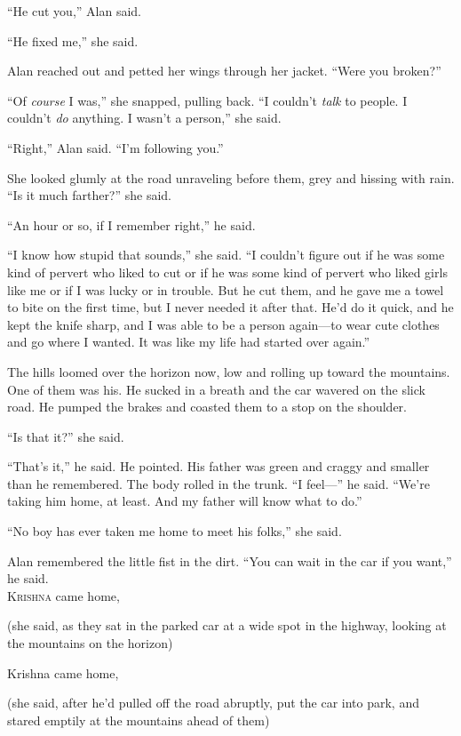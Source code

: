 ``He cut you,'' Alan said.

``He fixed me,'' she said.

Alan reached out and petted her wings through her jacket.  ``Were you
broken?''

``Of \textit{course} I was,'' she snapped, pulling back.  ``I couldn't
\textit{talk} to people.  I couldn't \textit{do} anything.  I wasn't a
person,'' she said.

``Right,'' Alan said.  ``I'm following you.''

She looked glumly at the road unraveling before them, grey and hissing
with rain.  ``Is it much farther?'' she said.

``An hour or so, if I remember right,'' he said.

``I know how stupid that sounds,'' she said.  ``I couldn't figure out
if he was some kind of pervert who liked to cut or if he was some kind
of pervert who liked girls like me or if I was lucky or in trouble. 
But he cut them, and he gave me a towel to bite on the first time, but
I never needed it after that.  He'd do it quick, and he kept the knife
sharp, and I was able to be a person again---to wear cute clothes and
go where I wanted.  It was like my life had started over again.''

The hills loomed over the horizon now, low and rolling up toward the
mountains.  One of them was his.  He sucked in a breath and the car
wavered on the slick road.  He pumped the brakes and coasted them to a
stop on the shoulder.

``Is that it?'' she said.

``That's it,'' he said.  He pointed.  His father was green and craggy
and smaller than he remembered.  The body rolled in the trunk.  ``I
feel---'' he said.  ``We're taking him home, at least.  And my father
will know what to do.''

``No boy has ever taken me home to meet his folks,'' she said.

Alan remembered the little fist in the dirt.  ``You can wait in the
car if you want,'' he said.
\\
\lettrine[lines=3, lhang=.5, nindent=0pt, findent=2pt]{K}{rishna} came home,

(she said, as they sat in the parked car at a wide spot in the
highway, looking at the mountains on the horizon)

Krishna came home,

(she said, after he'd pulled off the road abruptly, put the car into
park, and stared emptily at the mountains ahead of them)

